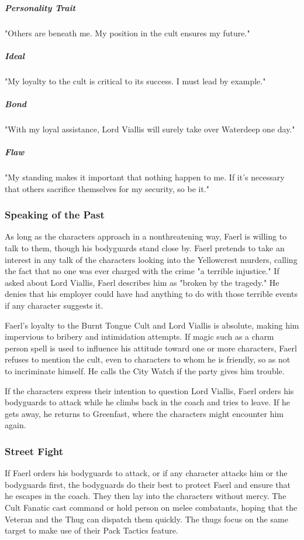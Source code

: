 \documentclass[10pt,a4paper,twoside,bg=print,twocolumn,openany,nodeprecatedcode]{dndbook}
\begin{document}
\subparagraph{Personality Trait}
"Others are beneath me. My position in the cult ensures my future."

\subparagraph{Ideal}
"My loyalty to the cult is critical to its success. I must lead by example."

\subparagraph{Bond}
"With my loyal assistance, Lord Viallis will surely take over Waterdeep one day."

\subparagraph{Flaw}
"My standing makes it important that nothing happen to me. If it's necessary that others sacrifice themselves for my security, so be it."

\subsubsection{Speaking of the Past}
As long as the characters approach in a nonthreatening way, Faerl is willing to talk to them, though his bodyguards stand close by. Faerl pretends to take an interest in any talk of the characters looking into the Yellowcrest murders, calling the fact that no one was ever charged with the crime "a terrible injustice." If asked about Lord Viallis, Faerl describes him as "broken by the tragedy." He denies that his employer could have had anything to do with those terrible events if any character suggests it.

Faerl's loyalty to the Burnt Tongue Cult and Lord Viallis is absolute, making him impervious to bribery and intimidation attempts. If magic such as a charm person spell is used to influence his attitude toward one or more characters, Faerl refuses to mention the cult, even to characters to whom he is friendly, so as not to incriminate himself. He calls the City Watch if the party gives him trouble.

If the characters express their intention to question Lord Viallis, Faerl orders his bodyguards to attack while he climbs back in the coach and tries to leave. If he gets away, he returns to Greenfast, where the characters might encounter him again.

\subsubsection{Street Fight}
If Faerl orders his bodyguards to attack, or if any character attacks him or the bodyguards first, the bodyguards do their best to protect Faerl and ensure that he escapes in the coach. They then lay into the characters without mercy. The Cult Fanatic cast command or hold person on melee combatants, hoping that the Veteran and the Thug can dispatch them quickly. The thugs focus on the same target to make use of their Pack Tactics feature.
\end{document}
